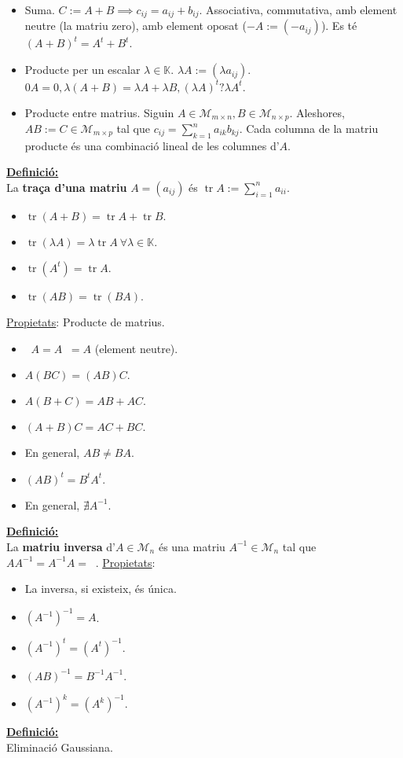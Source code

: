 \documentclass[11pt]{article}
\newcommand{\fieldk}{\mathbb{K}}
\newcommand{\propietats}{\underline{Propietats}: }
\newcommand{\definicio}{\underline{\textbf{Definició:}} \\}
\DeclareMathOperator{\idn}{Id_n}
\DeclareMathOperator{\idm}{Id_m}
\DeclareMathOperator{\tr}{tr}
\begin{document}
\begin{itemize}
	\item Suma. $C:=A+B\implies c_{ij}=a_{ij}+b_{ij}$. Associativa, commutativa, amb element neutre (la matriu zero), amb element oposat ($-A:=(-a_{ij})$). Es té $(A+B)^t=A^t+B^t$.
	\item Producte per un escalar $\lambda\in\fieldk$. $\lambda A:=(\lambda a_{ij})$. $0A=0,\lambda(A+B)=\lambda A+\lambda B,(\lambda A)^t?\lambda A^t.$
	\item Producte entre matrius. Siguin $A\in\mathcal{M}_{m\times n},B\in\mathcal{M}_{n\times p}$. Aleshores, $AB:=C\in\mathcal{M}_{m\times p}$ tal que $c_{ij}=\sum_{k=1}^na_{ik}b_{kj}.$ Cada columna de la matriu producte és una combinació lineal de les columnes d'$A$.
\end{itemize}
\definicio La \textbf{traça d'una matriu} $A=(a_{ij})$ és $\tr A:=\sum_{i=1}^na_{ii}$.
\begin{itemize}
	\item $\tr(A+B)=\tr A+\tr B.$
	\item $\tr(\lambda A)=\lambda\tr A\ \forall\lambda\in\fieldk.$
	\item $\tr(A^t)=\tr A.$
	\item $\tr(AB)=\tr(BA).$
\end{itemize}
\propietats Producte de matrius.
\begin{itemize}
	\item $\idm A=A\idn=A$ (element neutre).
	\item $A(BC)=(AB)C.$
	\item $A(B+C)=AB+AC.$
	\item $(A+B)C=AC+BC.$
	\item En general, $AB\neq BA$.
	\item $(AB)^t=B^tA^t.$
	\item En general, $\nexists A^{-1}.$
\end{itemize}
\definicio La \textbf{matriu inversa} d'$A\in\mathcal{M}_n$ és una matriu $A^{-1}\in\mathcal{M}_n$ tal que $AA^{-1}=A^{-1}A=\idn$.
\propietats
\begin{itemize}
	\item La inversa, si existeix, és única.
	\item $(A^{-1})^{-1}=A$.
	\item $(A^{-1})^t=(A^t)^{-1}.$
	\item $(AB)^{-1}=B^{-1}A^{-1}.$
	\item $(A^{-1})^k=(A^k)^{-1}.$
\end{itemize}
\definicio Eliminació Gaussiana.\\
\end{document}

